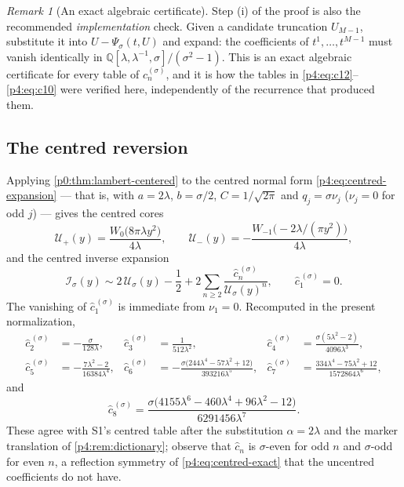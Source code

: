 \documentclass[11pt,a4paper,oneside]{book}
\theoremstyle{plain}
\theoremstyle{definition}
\theoremstyle{remark}
\newtheorem{remark}[theorem]{Remark}
\newcommand{\Rat}{\mathbb{Q}}
\newcommand{\Wlam}{W}
\begin{document}
\begin{remark}[An exact algebraic certificate]
\label{p4:rem:certificate}
Step (i) of the proof is also the recommended \emph{implementation} check.
Given a candidate truncation $U_{M-1}$, substitute it into
$U-\Psi_\sigma(t,U)$ and expand: the coefficients of
$t^{1},\ldots,t^{M-1}$ must vanish identically in
$\Rat[\lambda,\lambda^{-1},\sigma]/(\sigma^{2}-1)$.  This is an exact
algebraic certificate for every table of $c^{(\sigma)}_n$, and it is how the
tables in \cref{p4:eq:c12}--\cref{p4:eq:c10} were verified here, independently
of the recurrence that produced them.
\end{remark}

\subsection{The centred reversion}

Applying \cref{p0:thm:lambert-centered} to the centred normal form
\cref{p4:eq:centred-expansion} --- that is, with
$a=2\lambda$, $b=\sigma/2$, $C=1/\sqrt{2\pi}$ and $q_j=\sigma\nu_j$
($\nu_j=0$ for odd $j$) --- gives the centred cores
\begin{equation}
  \mathcal U_+(y)=\frac{\Wlam_0\!\bigl(8\pi\lambda y^{2}\bigr)}{4\lambda},
  \qquad
  \mathcal U_-(y)
  =-\frac{\Wlam_{-1}\!\bigl(-2\lambda/(\pi y^{2})\bigr)}{4\lambda},
  \label{p4:eq:centred-cores}
\end{equation}
and the centred inverse expansion
\begin{equation}
  \boxed{\;
  \mathcal I_\sigma(y)\sim 2\,\mathcal U_\sigma(y)-\frac12
   +2\sum_{n\ge2}\frac{\widehat c^{\,(\sigma)}_n}{\mathcal U_\sigma(y)^{n}},
  \qquad \widehat c^{\,(\sigma)}_1=0 .\;}
  \label{p4:eq:centred-inverse}
\end{equation}
The vanishing of $\widehat c^{\,(\sigma)}_1$ is immediate from
$\nu_1=0$.  Recomputed in the present normalization,
\begin{align}
  \widehat c^{\,(\sigma)}_2&=-\frac{\sigma}{128\lambda},
  &\widehat c^{\,(\sigma)}_3&=\frac1{512\lambda^{2}},
  &\widehat c^{\,(\sigma)}_4&=\frac{\sigma(5\lambda^{2}-2)}{4096\lambda^{3}},
  \label{p4:eq:chat234}\\
  \widehat c^{\,(\sigma)}_5&=-\frac{7\lambda^{2}-2}{16384\lambda^{4}},
  &\widehat c^{\,(\sigma)}_6&=-\frac{\sigma\bigl(244\lambda^{4}
     -57\lambda^{2}+12\bigr)}{393216\lambda^{5}},
  &\widehat c^{\,(\sigma)}_7&=\frac{334\lambda^{4}-75\lambda^{2}+12}
     {1572864\lambda^{6}},
  \label{p4:eq:chat567}
\end{align}
and
\begin{equation}
  \widehat c^{\,(\sigma)}_8
  =\frac{\sigma\bigl(4155\lambda^{6}-460\lambda^{4}
    +96\lambda^{2}-12\bigr)}{6291456\lambda^{7}} .
  \label{p4:eq:chat8}
\end{equation}
These agree with \textsf{S1}'s centred table after the substitution
$\alpha=2\lambda$ and the marker translation of \cref{p4:rem:dictionary};
observe that $\widehat c_n$ is $\sigma$-even for odd $n$ and $\sigma$-odd for
even $n$, a reflection symmetry of \cref{p4:eq:centred-exact} that the
uncentred coefficients do not have.
\end{document}
